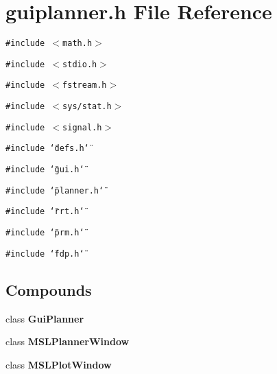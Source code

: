 \section{guiplanner.h File Reference}
\label{guiplanner_h}
{\tt \#include $<$math.h$>$}\par
{\tt \#include $<$stdio.h$>$}\par
{\tt \#include $<$fstream.h$>$}\par
{\tt \#include $<$sys/stat.h$>$}\par
{\tt \#include $<$signal.h$>$}\par
{\tt \#include \char`\"{}defs.h\char`\"{}}\par
{\tt \#include \char`\"{}gui.h\char`\"{}}\par
{\tt \#include \char`\"{}planner.h\char`\"{}}\par
{\tt \#include \char`\"{}rrt.h\char`\"{}}\par
{\tt \#include \char`\"{}prm.h\char`\"{}}\par
{\tt \#include \char`\"{}fdp.h\char`\"{}}\par
\subsection*{Compounds}
\begin{CompactItemize}
\item 
class {\bf Gui\-Planner}
\item 
class {\bf MSLPlanner\-Window}
\item 
class {\bf MSLPlot\-Window}
\end{CompactItemize}
